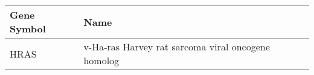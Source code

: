 \begin{tabular}{ll}
\toprule
Gene Symbol &                                               Name \\
\midrule
       HRAS & v-Ha-ras Harvey rat sarcoma viral oncogene homolog \\
\bottomrule
\end{tabular}
